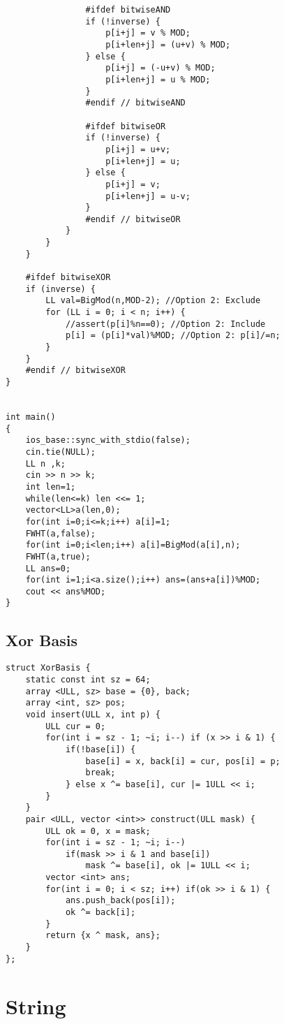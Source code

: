 \documentclass[FSZ,a4paper,onesided]{article}
\begin{document}
\begin{multicols*}{\COLS}
\begin{lstlisting}
                #ifdef bitwiseAND
                if (!inverse) {
                    p[i+j] = v % MOD;
                    p[i+len+j] = (u+v) % MOD;
                } else {
                    p[i+j] = (-u+v) % MOD;
                    p[i+len+j] = u % MOD;
                }
                #endif // bitwiseAND

                #ifdef bitwiseOR
                if (!inverse) {
                    p[i+j] = u+v;
                    p[i+len+j] = u;
                } else {
                    p[i+j] = v;
                    p[i+len+j] = u-v;
                }
                #endif // bitwiseOR
            }
        }
    }

    #ifdef bitwiseXOR
    if (inverse) {
        LL val=BigMod(n,MOD-2); //Option 2: Exclude
        for (LL i = 0; i < n; i++) {
            //assert(p[i]%n==0); //Option 2: Include
            p[i] = (p[i]*val)%MOD; //Option 2: p[i]/=n;
        }
    }
    #endif // bitwiseXOR
}


int main()
{
    ios_base::sync_with_stdio(false);
    cin.tie(NULL);
    LL n ,k;
    cin >> n >> k;
    int len=1;
    while(len<=k) len <<= 1;
    vector<LL>a(len,0);
    for(int i=0;i<=k;i++) a[i]=1;
    FWHT(a,false);
    for(int i=0;i<len;i++) a[i]=BigMod(a[i],n);
    FWHT(a,true);
    LL ans=0;
    for(int i=1;i<a.size();i++) ans=(ans+a[i])%MOD;
    cout << ans%MOD;
}
\end{lstlisting}
\subsection{Xor Basis}
\begin{lstlisting}
struct XorBasis {
    static const int sz = 64;
    array <ULL, sz> base = {0}, back;
    array <int, sz> pos;
    void insert(ULL x, int p) {
        ULL cur = 0;
        for(int i = sz - 1; ~i; i--) if (x >> i & 1) {
            if(!base[i]) {
                base[i] = x, back[i] = cur, pos[i] = p;
                break;
            } else x ^= base[i], cur |= 1ULL << i;
        }
    }
    pair <ULL, vector <int>> construct(ULL mask) {
        ULL ok = 0, x = mask;
        for(int i = sz - 1; ~i; i--)  
            if(mask >> i & 1 and base[i])
                mask ^= base[i], ok |= 1ULL << i;
        vector <int> ans;
        for(int i = 0; i < sz; i++) if(ok >> i & 1) {
            ans.push_back(pos[i]);
            ok ^= back[i];
        }
        return {x ^ mask, ans};
    } 
};\end{lstlisting}
\section{String}

\end{multicols*}
\end{document}

